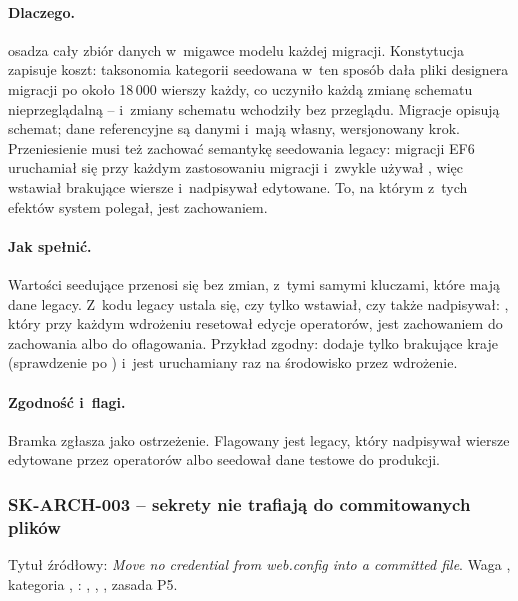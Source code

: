 \paragraph{Dlaczego.}  osadza cały zbiór danych w~migawce modelu każdej
migracji. Konstytucja zapisuje koszt: taksonomia kategorii seedowana w~ten sposób dała pliki
designera migracji po około 18\,000 wierszy każdy, co uczyniło każdą zmianę schematu
nieprzeglądalną -- i~zmiany schematu wchodziły bez przeglądu. Migracje opisują
schemat; dane referencyjne są danymi i~mają własny, wersjonowany krok. Przeniesienie musi też
zachować semantykę seedowania legacy:  migracji EF6 uruchamiał się przy każdym
zastosowaniu migracji i~zwykle używał , więc wstawiał brakujące wiersze
i~nadpisywał edytowane. To, na którym z~tych efektów system polegał, jest zachowaniem.

\paragraph{Jak spełnić.} Wartości seedujące przenosi się bez zmian, z~tymi samymi kluczami,
które mają dane legacy. Z~kodu  legacy ustala się, czy tylko wstawiał, czy
także nadpisywał: , który przy każdym wdrożeniu resetował edycje
operatorów, jest zachowaniem do zachowania albo do oflagowania. Przykład zgodny:
 dodaje tylko brakujące kraje (sprawdzenie po
) i~jest uruchamiany raz na środowisko przez wdrożenie.

\paragraph{Zgodność i~flagi.} Bramka zgłasza  jako
ostrzeżenie. Flagowany jest  legacy, który nadpisywał wiersze edytowane przez
operatorów albo seedował dane testowe do produkcji.


\subsubsection{SK-ARCH-003 -- sekrety nie trafiają do commitowanych plików}\label{sec:standardy-sk-arch-003}

Tytuł źródłowy: \emph{Move no credential from web.config into a committed file}. Waga
, kategoria , :
, , , zasada P5.

